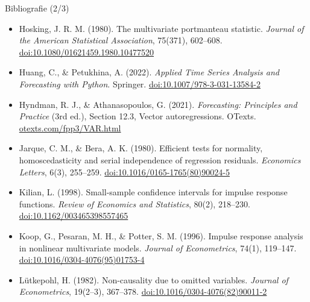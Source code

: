 \begin{frame}{Bibliografie (2/3)}
\itemsize{\scriptsize}
\begin{itemize}
    \item Hosking, J. R. M. (1980). The multivariate portmanteau statistic. \textit{Journal of the American Statistical Association}, 75(371), 602--608. \href{https://doi.org/10.1080/01621459.1980.10477520}{doi:10.1080/01621459.1980.10477520}
    \item Huang, C., \& Petukhina, A. (2022). \textit{Applied Time Series Analysis and Forecasting with Python}. Springer. \href{https://doi.org/10.1007/978-3-031-13584-2}{doi:10.1007/978-3-031-13584-2}
    \item Hyndman, R. J., \& Athanasopoulos, G. (2021). \textit{Forecasting: Principles and Practice} (3rd ed.), Section 12.3, Vector autoregressions. OTexts. \href{https://otexts.com/fpp3/VAR.html}{otexts.com/fpp3/VAR.html}
    \item Jarque, C. M., \& Bera, A. K. (1980). Efficient tests for normality, homoscedasticity and serial independence of regression residuals. \textit{Economics Letters}, 6(3), 255--259. \href{https://doi.org/10.1016/0165-1765(80)90024-5}{doi:10.1016/0165-1765(80)90024-5}
    \item Kilian, L. (1998). Small-sample confidence intervals for impulse response functions. \textit{Review of Economics and Statistics}, 80(2), 218--230. \href{https://doi.org/10.1162/003465398557465}{doi:10.1162/003465398557465}
    \item Koop, G., Pesaran, M. H., \& Potter, S. M. (1996). Impulse response analysis in nonlinear multivariate models. \textit{Journal of Econometrics}, 74(1), 119--147. \href{https://doi.org/10.1016/0304-4076(95)01753-4}{doi:10.1016/0304-4076(95)01753-4}
    \item Lütkepohl, H. (1982). Non-causality due to omitted variables. \textit{Journal of Econometrics}, 19(2--3), 367--378. \href{https://doi.org/10.1016/0304-4076(82)90011-2}{doi:10.1016/0304-4076(82)90011-2}
\end{itemize}
\end{frame}

